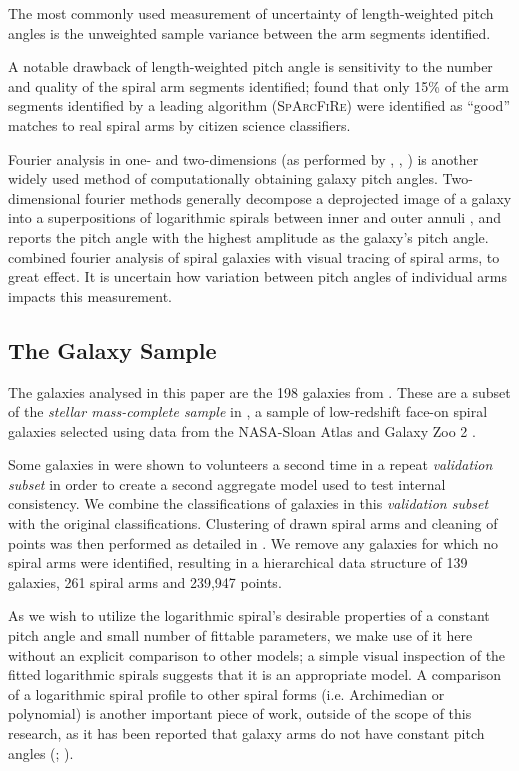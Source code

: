 The most commonly used measurement of uncertainty of length-weighted pitch angles is the unweighted sample variance between the arm segments identified.

A notable drawback of length-weighted pitch angle is sensitivity to the number and quality of the spiral arm segments identified; \citet{2017MNRAS.472.2263H} found that only 15\% of the arm segments identified by a leading algorithm (\textsc{SpArcFiRe}) were identified as ``good'' matches to real spiral arms by citizen science classifiers.

Fourier analysis in one- and two-dimensions (as performed by \citealt{2019arXiv190804246D}, \citealt{2012ApJS..199...33D}, \citealt{2018MNRAS.474.2594M}) is another widely used method of computationally obtaining galaxy pitch angles. Two-dimensional fourier methods generally decompose a deprojected image of a galaxy into a superpositions of logarithmic spirals between inner and outer annuli \citep{2012ApJS..199...33D}, and reports the pitch angle with the highest amplitude as the galaxy's pitch angle. \citet{2020MNRAS.493.3854H} combined fourier analysis of spiral galaxies with visual tracing of spiral arms, to great effect. It is uncertain how variation between pitch angles of individual arms impacts this measurement.

\subsection{The Galaxy Sample}
The galaxies analysed in this paper are the 198 galaxies from \Lingard. These are a subset of the \textit{stellar mass-complete sample} in \citet{2017MNRAS.472.2263H}, a sample of low-redshift face-on spiral galaxies selected using data from the NASA-Sloan Atlas \citep{2011AJ....142...31B} and Galaxy Zoo 2 \citep{Willett2013:1308.3496v2}.

Some galaxies in \Lingard were shown to volunteers a second time in a repeat \textit{validation subset} in order to create a second aggregate model used to test internal consistency. We combine the classifications of galaxies in this \textit{validation subset} with the original classifications. Clustering of drawn spiral arms and cleaning of points was then performed as detailed in \Lingard. We remove any galaxies for which no spiral arms were identified, resulting in a hierarchical data structure of 139 galaxies, 261 spiral arms and 239,947 points.

As we wish to utilize the logarithmic spiral's desirable properties of a constant pitch angle and small number of fittable parameters, we make use of it here without an explicit comparison to other models; a simple visual inspection of the fitted logarithmic spirals suggests that it is an appropriate model. A comparison of a logarithmic spiral profile to other spiral forms (i.e. Archimedian or polynomial) is another important piece of work, outside of the scope of this research, as it has been reported that galaxy arms do not have constant pitch angles (\citealt{1981AJ.....86.1847K}; \citealt{2009MNRAS.397..164R}).

